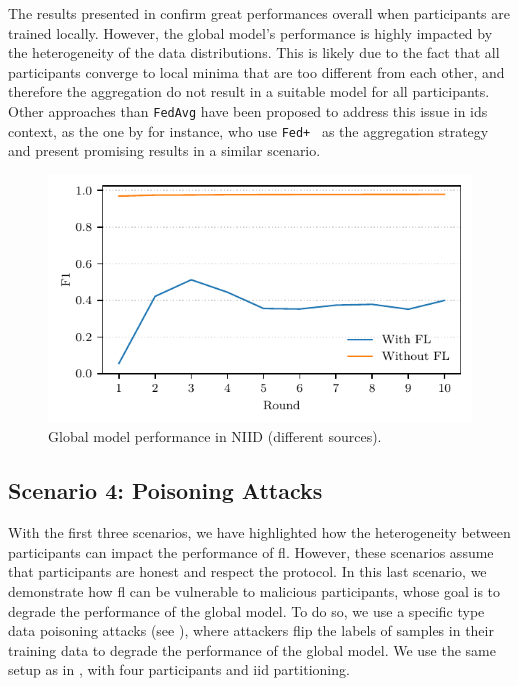 The results presented in  confirm great performances overall when participants are trained locally. 
However, the global model's performance is highly impacted by the heterogeneity of the data distributions.
This is likely due to the fact that all participants converge to local minima that are too different from each other, and therefore the aggregation do not result in a suitable model for all participants.
Other approaches than \texttt{FedAvg} have been proposed to address this issue in \gls{ids} context, as the one by \textcite{popoola_FederatedDeepLearning_2021} for instance, who use \texttt{Fed+}~\cite{kundu_RobustnessPersonalizationFederated_2022a} as the aggregation strategy and present promising results in a similar scenario.

\begin{figure}
    \centering
    \includegraphics{figures/heterogeneous.pdf}
    \caption{Global model performance in NIID (different sources).}
    \label{fig:heterogeneous}
\end{figure}


\subsection{Scenario 4: Poisoning Attacks\label{sec:app.demo.poisoning}}

With the first three scenarios, we have highlighted how the heterogeneity between participants can impact the performance of \gls{fl}.
However, these scenarios assume that participants are honest and respect the protocol.
In this last scenario, we demonstrate how \gls{fl} can be vulnerable to malicious participants, whose goal is to degrade the performance of the global model.
To do so, we use a specific type data poisoning attacks (see ), where attackers flip the labels of samples in their training data to degrade the performance of the global model.
We use the same setup as in , with four participants and \gls{iid} partitioning.

